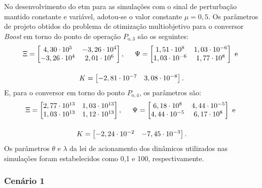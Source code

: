 No desenvolvimento do \acrshort{etm} para as simulações com o sinal de perturbação mantido constante e variável, adotou-se o valor constante $\mu = 0,5$. Os parâmetros de projeto obtidos do problema de otimização multiobjetivo para o conversor \textit{Boost }em torno do ponto de operação $P_{\mathrm{o}, 3}$ são os seguintes: \begin{gather}
  \Xi = \begin{bmatrix}
    4,30 \cdot 10^5  & -3,26 \cdot 10^4 \\
    -3,26 \cdot 10^4 & 2,01 \cdot 10^6  \\
  \end{bmatrix}, \hspace{.5cm}
  \Psi = \begin{bmatrix}
    1,51 \cdot 10^8    & 1,03 \cdot 10^{-6} \\
    1,03 \cdot 10^{-6} & 1,77 \cdot 10^8    \\
  \end{bmatrix} \text{ e } \notag \\[12pt]
  K = \begin{bmatrix}
    -2,81 \cdot 10^{-7} & 3,08 \cdot 10^{-8}
  \end{bmatrix} . \notag
\end{gather} E, para o conversor em torno do ponto $P_{\mathrm{o}, 4}$, os parâmetros são: \begin{gather}
  \Xi = \begin{bmatrix}
    2,77\cdot 10^{13} & 1,03\cdot 10^{13} \\
    1,03\cdot 10^{13} & 1,12\cdot 10^{13} \\
  \end{bmatrix}, \hspace{.5cm}
  \Psi = \begin{bmatrix}
    6,18\cdot 10^{8}  & 4,44\cdot 10^{-5} \\
    4,44\cdot 10^{-5} & 6,17\cdot 10^{8}  \\
  \end{bmatrix} \text{ e } \notag \\[12pt]
  K = \begin{bmatrix}
    -2,24 \cdot 10^{-2} & -7,45\cdot 10^{-3}
  \end{bmatrix} . \notag
\end{gather} Os parâmetros $\theta$ e $\lambda$ da lei de acionamento dos  dinâmicos utilizados nas simulações foram estabelecidos como 0,1 e 100, respectivamente.

\subsubsection{Cenário 1}

